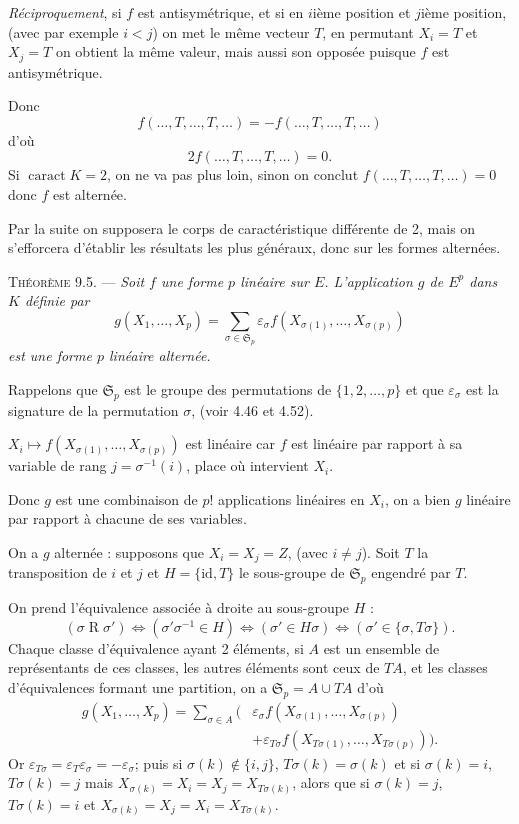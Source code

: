 \emph{Réciproquement}, si $f$ est antisymétrique, et si en $i$ième position et $j$ième position, (avec par exemple $i<j$) on met le même vecteur $T$, en permutant $X_i=T$ et $X_j=T$ on obtient la même valeur, mais aussi son opposée puisque $f$ est antisymétrique.

Donc
\[
f(\ldots,T,\ldots,T,\ldots)=-f(\ldots,T,\ldots,T,\ldots)
\]
d'où
\[
2f(\ldots,T,\ldots,T,\ldots)=0.
\]
Si $\operatorname{caract}K=2$, on ne va pas plus loin, sinon on conclut $f(\ldots,T,\ldots,T,\ldots)=0$ donc $f$ est alternée. \bookend

Par la suite on supposera le corps de caractéristique différente de 2, mais on s'efforcera d'établir les résultats les plus généraux, donc sur les formes alternées.

\medskip\noindent\textsc{Théorème 9.5.} --- \emph{Soit $f$ une forme $p$ linéaire sur $E$. L'application $g$ de $E^p$ dans $K$ définie par}
\[
g(X_1,\ldots,X_p)=\sum_{\sigma\in\mathfrak S_p}\varepsilon_\sigma f(X_{\sigma(1)},\ldots,X_{\sigma(p)})
\]
\emph{est une forme $p$ linéaire alternée.}

Rappelons que $\mathfrak S_p$ est le groupe des permutations de $\{1,2,\ldots,p\}$ et que $\varepsilon_\sigma$ est la signature de la permutation $\sigma$, (voir 4.46 et 4.52).

$X_i\longmapsto f(X_{\sigma(1)},\ldots,X_{\sigma(p)})$ est linéaire car $f$ est linéaire par rapport à sa variable de rang $j=\sigma^{-1}(i)$, place où intervient $X_i$.

Donc $g$ est une combinaison de $p!$ applications linéaires en $X_i$, on a bien $g$ linéaire par rapport à chacune de ses variables.

On a $g$ alternée : supposons que $X_i=X_j=Z$, (avec $i\ne j$). Soit $T$ la transposition de $i$ et $j$ et $H=\{\mathrm{id},T\}$ le sous-groupe de $\mathfrak S_p$ engendré par $T$.

On prend l'équivalence associée à droite au sous-groupe $H$ :
\[
(\sigma\mathrel R\sigma')\Longleftrightarrow(\sigma'\sigma^{-1}\in H)
\Longleftrightarrow(\sigma'\in H\sigma)
\Longleftrightarrow(\sigma'\in\{\sigma,T\sigma\}).
\]
Chaque classe d'équivalence ayant 2 éléments, si $A$ est un ensemble de représentants de ces classes, les autres éléments sont ceux de $TA$, et les classes d'équivalences formant une partition, on a $\mathfrak S_p=A\cup TA$ d'où
\[
\begin{aligned}
g(X_1,\ldots,X_p)=\sum_{\sigma\in A}\bigl(&\varepsilon_\sigma f(X_{\sigma(1)},\ldots,X_{\sigma(p)})\\
&+\varepsilon_{T\sigma}f(X_{T\sigma(1)},\ldots,X_{T\sigma(p)})\bigr).
\end{aligned}
\]
Or $\varepsilon_{T\sigma}=\varepsilon_T\varepsilon_\sigma=-\varepsilon_\sigma$; puis si $\sigma(k)\notin\{i,j\}$, $T\sigma(k)=\sigma(k)$ et si $\sigma(k)=i$, $T\sigma(k)=j$ mais $X_{\sigma(k)}=X_i=X_j=X_{T\sigma(k)}$, alors que si $\sigma(k)=j$, $T\sigma(k)=i$ et $X_{\sigma(k)}=X_j=X_i=X_{T\sigma(k)}$.

